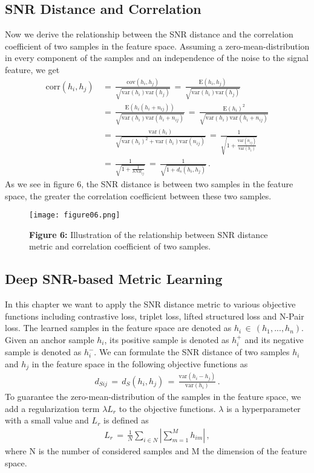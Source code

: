 \documentclass[12pt,paper=a4]{scrartcl}
\theoremstyle{break}
\begin{document}
\subsection{SNR Distance and Correlation}
Now we derive the relationship between the SNR distance and the correlation coefficient of two samples in the feature space. Assuming a zero-mean-distribution in every component of the samples and an independence of the noise to the signal feature, we get
\begin{align}
\mathrm{corr}(h_i,h_j)\,&=\,\frac{\mathrm{cov}(h_i,h_j)}{\sqrt{\mathrm{var}(h_i)\mathrm{var}(h_j)}}\,=\,\frac{\mathrm{E}(h_i,h_j)}{\sqrt{\mathrm{var}(h_i)\mathrm{var}(h_j)}} \\
&=\,\frac{\mathrm{E}\left( h_i\left( h_i+n_{ij}\right) \right)}{\sqrt{\mathrm{var}(h_i)\mathrm{var}(h_i+n_{ij})}}\,=\,\frac{\mathrm{E}(h_i)^2}{\sqrt{\mathrm{var}(h_i)\mathrm{var}(h_i+n_{ij})}} \\
&= \,\frac{\mathrm{var}(h_i)}{\sqrt{\mathrm{var}(h_i)^2+\mathrm{var}(h_i)\mathrm{var}(n_{ij})}}\, =\,\frac{1}{\sqrt{1+\frac{\mathrm{var}(n_{ij})}{\mathrm{var}(h_i)}}} \\
&=\,\frac{1}{\sqrt{1+\frac{1}{SNR_{ij}}}}\,=\,\frac{1}{\sqrt{1+d_s(h_i,h_j)}}\, .
\end{align}
As we see in figure 6, the SNR distance is between two samples in the feature space, the greater the correlation coefficient between these two samples.
\begin{figure}[h]
	\centering
  \texttt{[image: figure06.png]}
  \caption{\textbf{Figure 6:} Illustration of the relationship between SNR distance metric and correlation coefficient of two samples.}
\end{figure}
\subsection{Deep SNR-based Metric Learning}
In this chapter we want to apply the SNR distance metric to various objective functions including contrastive loss, triplet loss, lifted structured loss and N-Pair loss. The learned samples in the feature space are denoted as $h_i\,\in\,(h_1,...,h_n)$. Given an anchor sample $h_i$, its positive sample is denoted as $h_i^+$ and its negative sample is denoted as $h_i^-$. We can formulate the SNR distance of two samples $h_i$ and $h_j$ in the feature space in the following objective functions as
\begin{align}
d_{Sij}\,=\, d_S(h_i,h_j)\,=\,\frac{\mathrm{var}(h_i-h_j)}{\mathrm{var}(h_i)}\, .
\end{align}
To guarantee the zero-mean-distribution of the samples in the feature space, we add a regularization term $\lambda L_r$ to the objective functions. $\lambda$ is a hyperparameter with a small value and $L_r$ is defined as
\begin{align}
L_r\,=\,\frac{1}{N}\sum_{i\in N}|\sum_{m=1}^Mh_{im}|\, ,
\end{align}
where N is the number of considered samples and M the dimension of the feature space.
\end{document}

